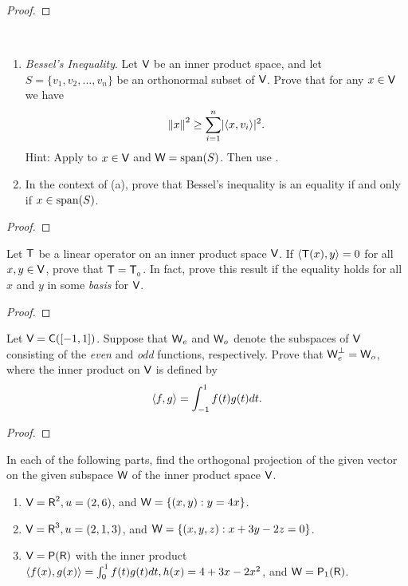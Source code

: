 \begin{proof}
\end{proof}

\begin{exercise} \label{exercise 6.2.16} \ 

\begin{enumerate}
\item \emph{Bessel's Inequality}.
Let \(\textsf{V}\) be an inner product space, and let \(S = \{ v_1, v_2, ..., v_n \}\) be an orthonormal subset of \(\textsf{V}\).
Prove that for any \(x \in \textsf{V}\) we have
\[
    \left\lVert x\right\rVert^2 \ge \sum_{i = 1}^n \lvert\left< x, v_i \right>\rvert^2.
\]
Hint: Apply  to \(x \in \textsf{V}\) and \(\textsf{W} = \operatorname{span}(S)\).
Then use .
\item In the context of (a), prove that Bessel's inequality is an equality if and only if \(x \in \operatorname{span}(S)\).
\end{enumerate}
\end{exercise}

\begin{proof}
\end{proof}

\begin{exercise} \label{exercise 6.2.17}
Let \(\textsf{T}\) be a linear operator on an inner product space \(\textsf{V}\).
If \(\left< \textsf{T}(x), y \right> = 0\) for all \(x, y \in \textsf{V}\), prove that \(\textsf{T} = \textsf{T}_{_0}\).
In fact, prove this result if the equality holds for all \(x\) and \(y\) in some \emph{basis} for \(\textsf{V}\).
\end{exercise}

\begin{proof}
\end{proof}

\begin{exercise} \label{exercise 6.2.18}
Let \(\textsf{V} = \textsf{C}([-1, 1])\).
Suppose that \(\textsf{W}_e\) and \(\textsf{W}_o\) denote the subspaces of \(\textsf{V}\) consisting of the \emph{even} and \emph{odd} functions, respectively.
Prove that \(\textsf{W}_e^{\perp} = \textsf{W}_o\), where the inner product on \(\textsf{V}\) is defined by
\[
    \left< f, g \right> = \int_{-1}^1 f(t) g(t) dt.
\]
\end{exercise}

\begin{proof}
\end{proof}

\begin{exercise} \label{exercise 6.2.19}
In each of the following parts, find the orthogonal projection of the given vector on the given subspace \(\textsf{W}\) of the inner product space \(\textsf{V}\).
\begin{enumerate}
\item \(\textsf{V} = \textsf{R}^2, u = (2, 6)\), and \(\textsf{W} = \{ (x, y): y = 4x \}\).
\item \(\textsf{V} = \textsf{R}^3, u = (2, 1, 3)\), and \(\textsf{W} = \{ (x, y, z): x + 3y - 2z = 0 \}\).
\item \(\textsf{V} = \textsf{P}(\textsf{R})\) with the inner product \(\left< f(x), g(x) \right> = \int_0^1 f(t) g(t) dt, h(x) = 4 + 3x - 2x^2\), and \(\textsf{W} = \textsf{P}_1(\textsf{R})\).
\end{enumerate}
\end{exercise}

